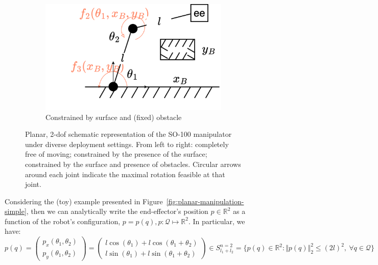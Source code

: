 \begin{figure}
\begin{subfigure}[t]{0.32\linewidth}
    \end{subfigure}\hfill
    \begin{subfigure}[t]{0.32\linewidth}
        \centering
        \includegraphics[width=\linewidth,height=\panelheight,keepaspectratio]{figures/ch2/ch2-planar-manipulator-floor-shelf.pdf}
        \caption{Constrained by surface and (fixed) obstacle}
        \label{fig:planar-manipulator-floor-shelf}
    \end{subfigure}
    \caption{Planar, 2-dof schematic representation of the SO-100 manipulator under diverse deployment settings. From left to right: completely free of moving; constrained by the presence of the surface; constrained by the surface and presence of obstacles. Circular arrows around each joint indicate the maximal rotation feasible at that joint.}
\end{figure}

Considering the (toy) example presented in Figure~\ref{fig:planar-manipulation-simple}, then we can analytically write the end-effector's position \( p \in \mathbb R^2 \) as a function of the robot's configuration, \( p = p(q), p: \mathcal Q \mapsto \mathbb R^2 \). 
In particular, we have:
\begin{equation*}
p(q) = 
\begin{pmatrix}
p_x(\theta_1, \theta_2) \\  
p_y(\theta_1, \theta_2)
\end{pmatrix}
=
\begin{pmatrix}
l \cos(\theta_1) + l \cos(\theta_1 + \theta_2) \\
l \sin(\theta_1) + l \sin(\theta_1 + \theta_2)
\end{pmatrix}
\in S^{n=2}_{l_1+l_2} = \{ p(q) \in \mathbb R^2: \Vert p(q) \Vert_2^2 \leq (2l)^2, \ \forall q \in \mathcal Q \}
\end{equation*}

